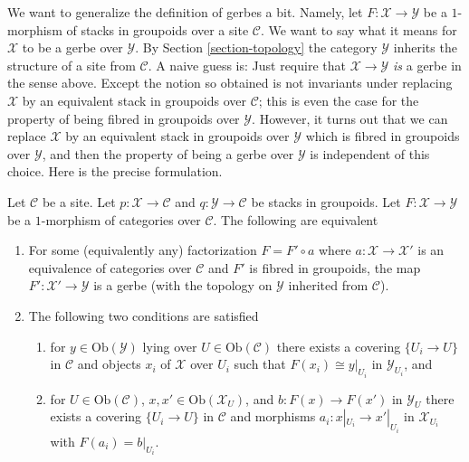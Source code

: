 \noindent
We want to generalize the definition of gerbes a bit. Namely, let
$F : \mathcal{X} \to \mathcal{Y}$ be a $1$-morphism of stacks in groupoids
over a site $\mathcal{C}$. We want to say what it
means for $\mathcal{X}$ to be a gerbe over $\mathcal{Y}$. By
Section \ref{section-topology}
the category $\mathcal{Y}$ inherits the structure of a site from
$\mathcal{C}$. A naive guess is: Just require that
$\mathcal{X} \to \mathcal{Y}$ {\it is} a gerbe in the sense above. Except
the notion so obtained is not invariants under replacing $\mathcal{X}$
by an equivalent stack in groupoids over $\mathcal{C}$; this is even the
case for the property of being fibred in groupoids over $\mathcal{Y}$.
However, it turns out that we can replace $\mathcal{X}$ by an equivalent
stack in groupoids over $\mathcal{Y}$ which is fibred in groupoids over
$\mathcal{Y}$, and then the property of being a gerbe over $\mathcal{Y}$
is independent of this choice. Here is the precise formulation.

\begin{lemma}
\label{lemma-when-gerbe}
Let $\mathcal{C}$ be a site. Let $p : \mathcal{X} \to \mathcal{C}$
and $q : \mathcal{Y} \to \mathcal{C}$ be stacks in groupoids.
Let $F : \mathcal{X} \to \mathcal{Y}$ be a $1$-morphism of categories
over $\mathcal{C}$. The following are equivalent
\begin{enumerate}
\item For some (equivalently any) factorization $F = F' \circ a$ where
$a : \mathcal{X} \to \mathcal{X}'$ is an equivalence of categories over
$\mathcal{C}$ and $F'$ is fibred in groupoids, the map
$F' : \mathcal{X}' \to \mathcal{Y}$ is a gerbe (with the topology
on $\mathcal{Y}$ inherited from $\mathcal{C}$).
\item The following two conditions are satisfied
\begin{enumerate}
\item for $y \in \text{Ob}(\mathcal{Y})$ lying over
$U \in \text{Ob}(\mathcal{C})$ there exists a covering
$\{U_i \to U\}$ in $\mathcal{C}$ and objects $x_i$ of $\mathcal{X}$
over $U_i$ such that $F(x_i) \cong y|_{U_i}$ in $\mathcal{Y}_{U_i}$, and
\item for $U \in \text{Ob}(\mathcal{C})$,
$x, x' \in \text{Ob}(\mathcal{X}_U)$, and $b : F(x) \to F(x')$ in
$\mathcal{Y}_U$ there exists
a covering $\{U_i \to U\}$ in $\mathcal{C}$ and morphisms
$a_i : x|_{U_i} \to x'|_{U_i}$ in $\mathcal{X}_{U_i}$ with
$F(a_i) = b|_{U_i}$.
\end{enumerate}
\end{enumerate}
\end{lemma}

